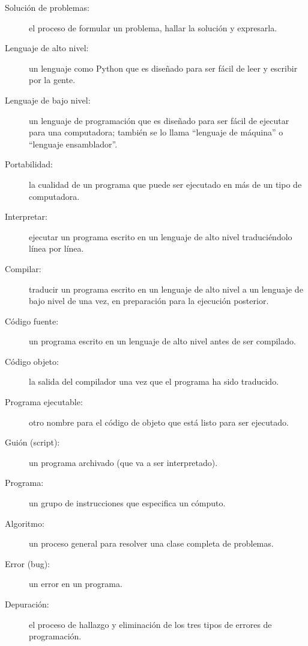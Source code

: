 \begin{description}
	\item[Solución de problemas:]  el proceso de formular un problema,
	hallar la solución y expresarla.
	
	\item[Lenguaje de alto nivel:]  un lenguaje como Python que es diseñado
	para ser fácil de leer y escribir por la gente.
	
	\item[Lenguaje de bajo nivel:]  un lenguaje de programación que es
	diseñado para ser fácil de ejecutar para una computadora; también
	se lo llama ``lenguaje de máquina'' o ``lenguaje ensamblador''.
	
	\item[Portabilidad:]  la cualidad de un programa que puede ser 
	ejecutado
	en más de un tipo de computadora.
	
	\item[Interpretar:]  ejecutar un programa escrito en un lenguaje de
	alto nivel traduciéndolo línea por línea.
	
	\item[Compilar:]  traducir un programa escrito en un lenguaje
	de alto nivel a un lenguaje de bajo nivel de una vez,
	en preparación para la ejecución posterior.
	
	\item[Código fuente:]  un programa escrito en un lenguaje de alto
	nivel antes de ser compilado.
	
	\item[Código objeto:]  la salida del compilador una vez que
	el programa ha sido traducido.
	
	\item[Programa ejecutable:]  otro nombre para el código de objeto
	que está listo para ser ejecutado.
	
	\item[Guión (script):] un programa archivado (que va a ser interpretado).
	
	\item[Programa:] un grupo de instrucciones que especifica un cómputo.
	
	\item[Algoritmo:]  un proceso general para resolver una
	clase completa de problemas.
	
	\item[Error (bug):]  un error en un programa.
	
	\item[Depuración:]  el proceso de hallazgo y eliminación de los
	tres tipos de errores de programación.
	

\end{description}
